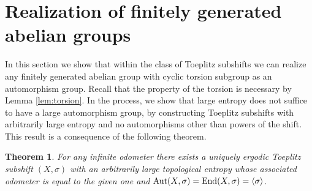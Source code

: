 \documentclass{daj}
\theoremstyle{plain}
\newtheorem{theorem}{Theorem}[section]
\theoremstyle{definition}
\begin{document}
\section{Realization of  finitely generated abelian groups}\label{sec:realisation}

In this section we show that within the class of Toeplitz subshifts we can realize any finitely generated abelian group with cyclic torsion subgroup as an automorphism group. Recall that the property of the torsion is necessary by Lemma \ref{lem:torsion}. In the process, we show that large entropy does not suffice to have a large automorphism group, by constructing Toeplitz subshifts with arbitrarily large entropy and no automorphisms other than powers of the shift. This result is a consequence of the following theorem.

\begin{theorem}\label{Thm:EntropyToeplitz2}
	For any infinite odometer there exists a uniquely ergodic Toeplitz subshift $(X, \sigma)$ with an arbitrarily large topological entropy whose associated odometer is equal to the given one and 
	${\rm Aut}(X,\sigma) = {\rm End}(X,\sigma) =\langle \sigma \rangle$.  
\end{theorem}
\end{document}
